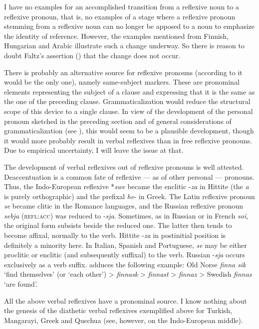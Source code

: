 I have no examples for an accomplished transition from a reflexive noun to a reflexive pronoun, that is, no examples of a stage where a reflexive pronoun stemming from a reflexive noun can no longer be apposed to a noun to emphasize the identity of reference. However, the examples mentioned from Finnish, Hungarian and Arabic illustrate such a change underway. So there is reason to doubt Faltz's assertion (\citeyear[236--238]{Faltz1977}) that the change does not occur.

There is probably an alternative source for reflexive pronouns (according to \citet[248--266]{Faltz1977} it would be the only one), namely same-subject markers. These are pronominal elements representing the subject of a clause and expressing that it is the same as the one of the preceding clause. Grammaticalization would reduce the structural scope of this device to a single clause. In view of the development of the personal pronoun sketched in the preceding section and of general considerations of grammaticalization (see ), this would seem to be a plausible development, though it would more probably result in verbal reflexives than in free reflexive pronouns. Due to empirical uncertainty, I will leave the issue at that.

The development of verbal reflexives out of reflexive pronouns is well attested. Deaccentuation is a common fate of reflexive — as of other personal — pronouns. Thus, the Indo-European reflexive *\textit{swe} became the enclitic -\textit{za} in Hittite (the \textit{a} is purely orthographic) and the prefixal \textit{he}{}- in Greek. The Latin reflexive pronoun \textit{se} became clitic in the Romance languages, and the Russian reflexive pronoun \textit{sebja} (\textsc{refl:acc}) was reduced to -\textit{sja}. Sometimes, as in Russian or in French \textit{soi}, the original form subsists beside the reduced one. The latter then tends to become affixal, normally to the verb. Hittite -\textit{za} in postinitial position is definitely a minority here. In Italian, Spanish and Portuguese, \textit{se} may be either proclitic or enclitic (and subsequently suffixal) to the verb. Russian -\textit{sja} occurs exclusively as a verb suffix. \citet[377]{Jespersen1922} adduces the following example: Old Norse \textit{finna sik} ‘find themselves’ (or ‘each other’) {\textgreater} \textit{finnask} {\textgreater} \textit{finnast} {\textgreater} \textit{finnaz} {\textgreater} Swedish \textit{finnas} ‘are found’.

All the above verbal reflexives have a pronominal source. I know nothing about the genesis of the diathetic verbal reflexives exemplified above for Turkish, Mangarayi, Greek and Quechua (see, however, \citealt[305--309]{Szemerényi1970} on the Indo-European middle).

